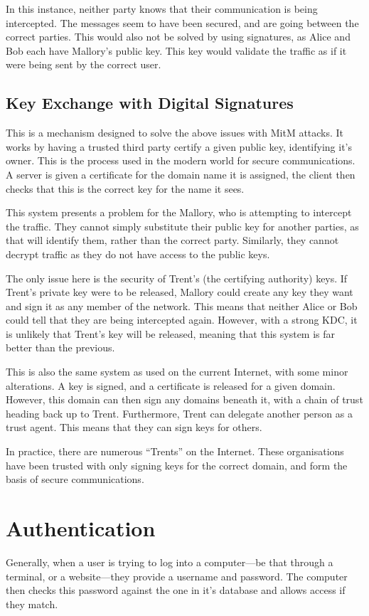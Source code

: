 			In this instance, neither party knows that their communication is being intercepted. 
			The messages seem to have been secured, and are going between the correct parties. 
			This would also not be solved by using signatures, as Alice and Bob each have Mallory's public key. 
			This key would validate the traffic as if it were being sent by the correct user. 

		\subsection{Key Exchange with Digital Signatures}
			This is a mechanism designed to solve the above issues with MitM attacks. 
			It works by having a trusted third party certify a given public key, identifying it's owner. 
			This is the process used in the modern world for secure communications. 
			A server is given a certificate for the domain name it is assigned, the client then checks that this is the correct key for the name it sees. 

			This system presents a problem for the Mallory, who is attempting to intercept the traffic. 
			They cannot simply substitute their public key for another parties, as that will identify them, rather than the correct party. 
			Similarly, they cannot decrypt traffic as they do not have access to the public keys. 

			The only issue here is the security of Trent's (the certifying authority) keys.
			If Trent's private key were to be released, Mallory could create any key they want and sign it as any member of the network. 
			This means that neither Alice or Bob could tell that they are being intercepted again. 
			However, with a strong KDC, it is unlikely that Trent's key will be released, meaning that this system is far better than the previous. 

			This is also the same system as used on the current Internet, with some minor alterations. 
			A key is signed, and a certificate is released for a given domain. 
			However, this domain can then sign any domains beneath it, with a chain of trust heading back up to Trent. 
			Furthermore, Trent can delegate another person as a trust agent. 
			This means that they can sign keys for others. 

			In practice, there are numerous ``Trents'' on the Internet. 
			These organisations have been trusted with only signing keys for the correct domain, 
			and form the basis of secure communications. 
	\section{Authentication}
		Generally, when a user is trying to log into a computer---be that through a terminal, or a website---they provide a username and password. 
		The computer then checks this password against the one in it's database and allows access if they match. 

